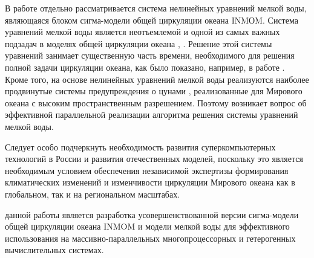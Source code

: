 В работе отдельно рассматривается система нелинейных уравнений мелкой воды,
являющаяся блоком сигма-модели общей циркуляции океана INMОM.
Система уравнений мелкой воды является неотъемлемой и одной из самых важных подзадач в моделях общей циркуляции океана , .
Решение этой системы уравнений занимает существенную часть времени, необходимого для решения полной задачи циркуляции океана,
как было показано, например, в работе \cite{ChaplyginINMOM2017}.
Кроме того, на основе нелинейных уравнений мелкой воды реализуются наиболее продвинутые системы
предупреждения о цунами , реализованные для Мирового океана с высоким пространственным разрешением.
Поэтому возникает вопрос об эффективной параллельной реализации алгоритма решения системы уравнений мелкой воды.

Следует особо подчеркнуть необходимость развития суперкомпьютерных технологий в России и развития отечественных моделей, поскольку это является необходимым условием обеспечения независимой экспертизы формирования климатических изменений и изменчивости циркуляции Мирового океана как в глобальном, так и на региональном масштабах.


{\aim} данной работы является разработка усовершенствованной версии сигма-модели общей циркуляции океана INMOM и модели мелкой воды для эффективного использования на массивно-параллельных многопроцессорных и гетерогенных вычислительных системах.


